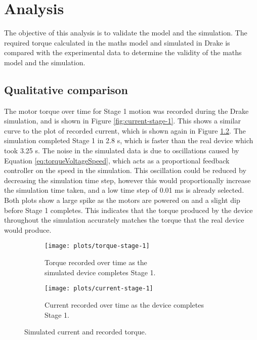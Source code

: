 \chapter{Analysis}

The objective of this analysis is to validate the model and the simulation. The required torque calculated in the maths model and simulated in Drake is compared with the experimental data to determine the validity of the maths model and the simulation.

\section{Qualitative comparison}

The motor torque over time for Stage 1 motion was recorded during the Drake simulation, and is shown in Figure \ref{fig:current-stage-1}. This shows a similar curve to the plot of recorded current, which is shown again in Figure \ref{fig:current-2}. The simulation completed Stage 1 in 2.8 s, which is faster than the real device which took 3.25 s. The noise in the simulated data is due to oscillations caused by Equation \ref{eq:torqueVoltageSpeed}, which acts as a proportional feedback controller on the speed in the simulation. This oscillation could be reduced by decreasing the simulation time step, however this would proportionally increase the simulation time taken, and a low time step of 0.01 ms is already selected. Both plots show a large spike as the motors are powered on and a slight dip before Stage 1 completes. This indicates that the torque produced by the device throughout the simulation accurately matches the torque that the real device would produce.
\begin{figure}[!ht]
	\centering
	\begin{subfigure}{.5\textwidth}
		\centering
		\texttt{[image: plots/torque-stage-1]}
		\caption{Torque recorded over time as the \\simulated device completes Stage 1.}
		\label{fig:torque-stage-1}
	\end{subfigure}%
	\begin{subfigure}{.5\textwidth}
		\centering
		\texttt{[image: plots/current-stage-1]}
		\caption{Current recorded over time as the device completes Stage 1.}
		\label{fig:current-2}
	\end{subfigure}
	\caption{Simulated current and recorded torque.}
	\label{fig:torque-current}
\end{figure}


